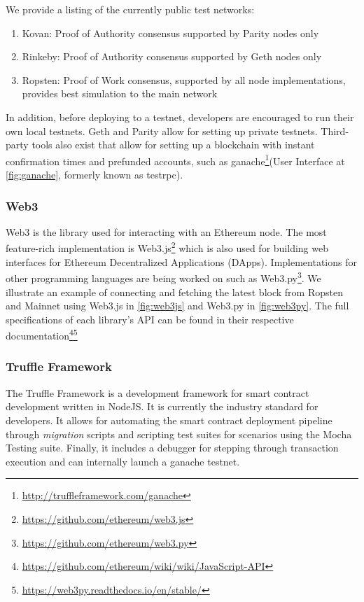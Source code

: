 We provide a listing of the currently public test networks:
\begin{enumerate}
    \item Kovan: Proof of Authority consensus supported by Parity nodes only
    \item Rinkeby: Proof of Authority consensus supported by Geth nodes only
    \item Ropsten: Proof of Work consensus, supported by all node implementations, provides best simulation to the main network 
\end{enumerate}

In addition, before deploying to a testnet, developers are encouraged to run their own local testnets. Geth and Parity allow for setting up private testnets. Third-party tools also exist that allow for setting up a blockchain with instant confirmation times and prefunded accounts, such as ganache\footnote{\url{http://truffleframework.com/ganache}}(User Interface at \ref{fig:ganache},  formerly known as testrpc).


\subsubsection{Web3}
Web3 is the library used for interacting with an Ethereum node. The most feature-rich implementation is Web3.js\footnote{\url{https://github.com/ethereum/web3.js}} which is also used for building web interfaces for Ethereum Decentralized Applications (DApps). Implementations for other programming languages are being worked on such as Web3.py\footnote{\url{https://github.com/ethereum/web3.py}}. We illustrate an example of connecting and fetching the latest block from Ropsten and Mainnet using Web3.js in \ref{fig:web3js} and Web3.py in \ref{fig:web3py}. The full specifications of each library's API can be found in their respective documentation\footnote{\url{https://github.com/ethereum/wiki/wiki/JavaScript-API}}\footnote{\url{https://web3py.readthedocs.io/en/stable/}}


\subsubsection{Truffle Framework}
The Truffle Framework is a development framework for smart contract development written in NodeJS. It is currently the industry standard for developers. It allows for automating the smart contract deployment pipeline through \textit{migration} scripts and scripting test suites for scenarios using the Mocha Testing suite. Finally, it includes a debugger for stepping through transaction execution and can internally launch a ganache testnet.

